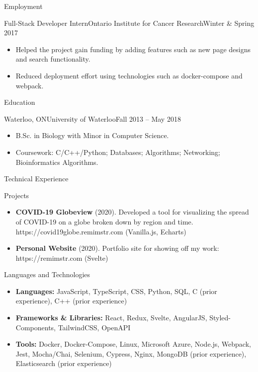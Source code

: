 \documentclass[]{mcdowellcv}
\begin{document}
\begin{cvsection}{Employment}
		\begin{cvsubsection}{Full-Stack Developer Intern}{Ontario Institute for Cancer Research}{Winter \& Spring 2017}
			\begin{itemize}
				\item Helped the project gain funding by adding features such as new page designs and search functionality.
				\item Reduced deployment effort using technologies such as docker-compose and webpack.
			\end{itemize}
		\end{cvsubsection}
	\end{cvsection}

	\begin{cvsection}{Education}
		\begin{cvsubsection}{Waterloo, ON}{University of Waterloo}{Fall 2013 -- May 2018}
			\begin{itemize}
				\item B.Sc. in Biology with Minor in Computer Science.
				\item Coursework: C/C++/Python; Databases; Algorithms; Networking; Bioinformatics Algorithms.
			\end{itemize}
		\end{cvsubsection}
	\end{cvsection}

	\begin{cvsection}{Technical Experience}
		\begin{cvsubsection}{Projects}{}{}
			\begin{itemize}
				\item \textbf{COVID-19 Globeview} (2020). Developed a tool for visualizing the spread of COVID-19 on a globe broken down by region and time.
					https://covid19globe.remimstr.com (Vanilla.js, Echarts)
				\item \textbf{Personal Website} (2020). Portfolio site for showing off my work: https://remimstr.com (Svelte)
			\end{itemize}
		\end{cvsubsection}
	\end{cvsection}

	\begin{cvsection}{Languages and Technologies}
		\begin{cvsubsection}{}{}{}
			\begin{itemize}
				\item \textbf{Languages:} JavaScript, TypeScript, CSS, Python, SQL, C (prior experience), C++ (prior experience)
				\item \textbf{Frameworks \& Libraries:} React, Redux, Svelte, AngularJS, Styled-Components, TailwindCSS, OpenAPI
				\item \textbf{Tools:} Docker, Docker-Compose, Linux, Microsoft Azure, Node.js, Webpack, Jest, Mocha/Chai, Selenium, Cypress, Nginx, MongoDB (prior experience), Elasticsearch (prior experience)
			\end{itemize}
		\end{cvsubsection}
	\end{cvsection}
\end{document}
